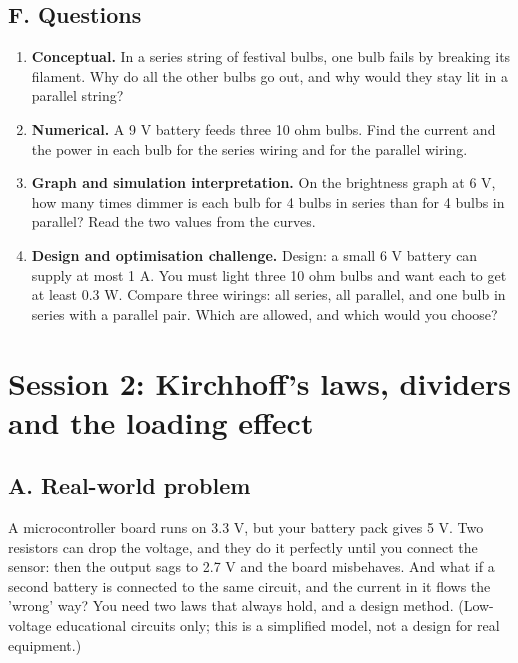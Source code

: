 \documentclass[11pt,a4paper]{article}
\begin{document}
\subsection*{F. Questions}
\begin{enumerate}[nosep]
\item \textbf{Conceptual.} In a series string of festival bulbs, one bulb fails by breaking its filament. Why do all the other bulbs go out, and why would they stay lit in a parallel string?
\item \textbf{Numerical.} A 9 V battery feeds three 10 ohm bulbs. Find the current and the power in each bulb for the series wiring and for the parallel wiring.
\item \textbf{Graph and simulation interpretation.} On the brightness graph at 6 V, how many times dimmer is each bulb for 4 bulbs in series than for 4 bulbs in parallel? Read the two values from the curves.
\item \textbf{Design and optimisation challenge.} Design: a small 6 V battery can supply at most 1 A. You must light three 10 ohm bulbs and want each to get at least 0.3 W. Compare three wirings: all series, all parallel, and one bulb in series with a parallel pair. Which are allowed, and which would you choose?
\end{enumerate}

\section{Session 2: Kirchhoff's laws, dividers and the loading effect}

\subsection*{A. Real-world problem}
A microcontroller board runs on 3.3 V, but your battery pack gives 5 V. Two resistors can drop the voltage, and they do it perfectly until you connect the sensor: then the output sags to 2.7 V and the board misbehaves. And what if a second battery is connected to the same circuit, and the current in it flows the 'wrong' way? You need two laws that always hold, and a design method. (Low-voltage educational circuits only; this is a simplified model, not a design for real equipment.)
\end{document}
